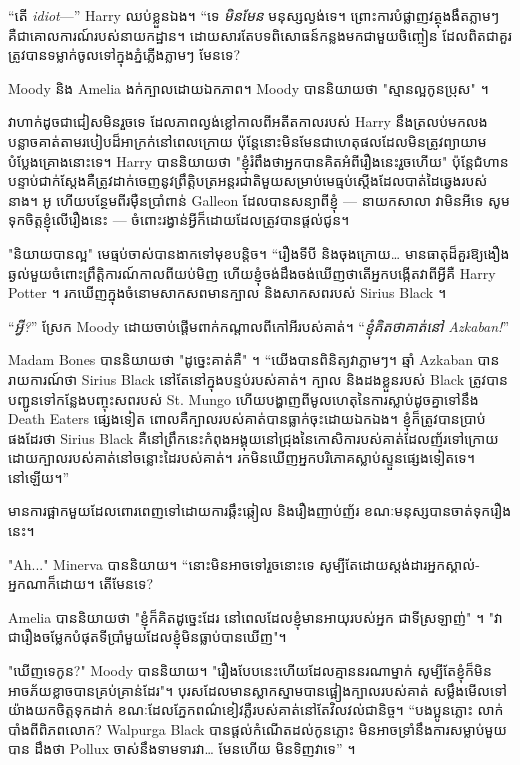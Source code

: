 “តើ \emph{idiot}—” Harry ឈប់ខ្លួនឯង។ “ទេ \emph{មិនមែន} មនុស្សល្ងង់ទេ។ ព្រោះការបំផ្លាញវត្ថុងងឹតភ្លាមៗ គឺជាគោលការណ៍របស់នាយកដ្ឋាន។ ដោយសារតែបទពិសោធន៍កន្លងមកជាមួយចិញ្ចៀន ដែលពិតជាគួរត្រូវបានទម្លាក់ចូលទៅក្នុងភ្នំភ្លើងភ្លាមៗ មែនទេ?

Moody និង Amelia ងក់ក្បាលដោយឯកភាព។ Moody បាននិយាយថា "ស្មានល្អកូនប្រុស" ។

វាហាក់ដូចជាជៀសមិនរួចទេ ដែលភាពល្ងង់ខ្លៅកាលពីអតីតកាលរបស់ Harry នឹងត្រលប់មកលងបន្លាចគាត់តាមរបៀបដ៏អាក្រក់នៅពេលក្រោយ ប៉ុន្តែនោះមិនមែនជាហេតុផលដែលមិនត្រូវព្យាយាមបំប្លែងគ្រោងនោះទេ។ Harry បាននិយាយថា "ខ្ញុំរំពឹងថាអ្នកបានគិតអំពីរឿងនេះរួចហើយ" ប៉ុន្តែជំហានបន្ទាប់ជាក់ស្តែងគឺត្រូវដាក់ចេញនូវព្រឹត្តិបត្រអន្តរជាតិមួយសម្រាប់មេធ្មប់ស្តើងដែលបាត់ដៃឆ្វេងរបស់នាង។ អូ ហើយបន្ថែមពីរម៉ឺនប្រាំពាន់ Galleon ដែលបានសន្យាពីខ្ញុំ — នាយកសាលា វាមិនអីទេ សូមទុកចិត្តខ្ញុំលើរឿងនេះ — ចំពោះរង្វាន់អ្វីក៏ដោយដែលត្រូវបានផ្តល់ជូន។

"និយាយបានល្អ" មេធ្មប់ចាស់បានងាកទៅមុខបន្តិច។ “រឿងទីបី និងចុងក្រោយ… មានធាតុដ៏គួរឱ្យងឿងឆ្ងល់មួយចំពោះព្រឹត្តិការណ៍កាលពីយប់មិញ ហើយខ្ញុំចង់ដឹងចង់ឃើញថាតើអ្នកបង្កើតវាពីអ្វីគឺ Harry Potter ។ រកឃើញក្នុងចំនោមសាកសពមានក្បាល និងសាកសពរបស់ Sirius Black ។

“\emph{អ្វី?}” ស្រែក Moody ដោយចាប់ផ្តើមពាក់កណ្តាលពីកៅអីរបស់គាត់។ “\emph{ខ្ញុំគិតថាគាត់នៅ Azkaban!}”

Madam Bones បាននិយាយថា "ដូច្នេះគាត់គឺ" ។ “យើង​បាន​ពិនិត្យ​វា​ភ្លាមៗ។ ឆ្មាំ Azkaban បានរាយការណ៍ថា Sirius Black នៅតែនៅក្នុងបន្ទប់របស់គាត់។ ក្បាល និងដងខ្លួនរបស់ Black ត្រូវបានបញ្ជូនទៅកន្លែងបញ្ចុះសពរបស់ St. Mungo ហើយបង្ហាញពីមូលហេតុនៃការស្លាប់ដូចគ្នាទៅនឹង Death Eaters ផ្សេងទៀត ពោលគឺក្បាលរបស់គាត់បានធ្លាក់ចុះដោយឯកឯង។ ខ្ញុំក៏ត្រូវបានប្រាប់ផងដែរថា Sirius Black គឺនៅព្រឹកនេះកំពុងអង្គុយនៅជ្រុងនៃកោសិការបស់គាត់ដែលញ័រទៅក្រោយដោយក្បាលរបស់គាត់នៅចន្លោះដៃរបស់គាត់។ រកមិនឃើញអ្នកបរិភោគស្លាប់ស្ទួនផ្សេងទៀតទេ។ នៅឡើយ។”

មាន​ការ​ផ្អាក​មួយ​ដែល​ពោរពេញ​ទៅ​ដោយ​ការ​ឆ្កឹះ​ឆ្កៀល និង​រឿង​ញាប់​ញ័រ ខណៈ​មនុស្ស​បាន​ចាត់​ទុក​រឿង​នេះ។

"Ah..." Minerva បាននិយាយ។ “នោះមិនអាចទៅរួចនោះទេ សូម្បីតែដោយស្តង់ដារអ្នកស្គាល់-អ្នកណាក៏ដោយ។ តើមែនទេ?

Amelia បាននិយាយថា "ខ្ញុំក៏គិតដូច្នេះដែរ នៅពេលដែលខ្ញុំមានអាយុរបស់អ្នក ជាទីស្រឡាញ់" ។ "វា​ជា​រឿង​ចម្លែក​បំផុត​ទី​ប្រាំមួយ​ដែល​ខ្ញុំ​មិន​ធ្លាប់​បាន​ឃើញ"។

"ឃើញទេកូន?" Moody បាននិយាយ។ "រឿង​បែប​នេះ​ហើយ​ដែល​គ្មាន​នរណា​ម្នាក់ សូម្បី​តែ​ខ្ញុំ​ក៏​មិន​អាច​ភ័យ​ខ្លាច​បាន​គ្រប់​គ្រាន់​ដែរ"។ បុរសដែលមានស្លាកស្នាមបានផ្អៀងក្បាលរបស់គាត់ សម្លឹងមើលទៅយ៉ាងយកចិត្តទុកដាក់ ខណៈដែលភ្នែកពណ៌ខៀវភ្លឺរបស់គាត់នៅតែវិលវល់ជានិច្ច។ “បងប្អូនភ្លោះ លាក់បាំងពីពិភពលោក? Walpurga Black បានផ្តល់កំណើតដល់កូនភ្លោះ មិនអាចទ្រាំនឹងការសម្លាប់មួយបាន ដឹងថា Pollux ចាស់នឹងទាមទារវា… មែនហើយ មិនទិញវាទេ” ។

